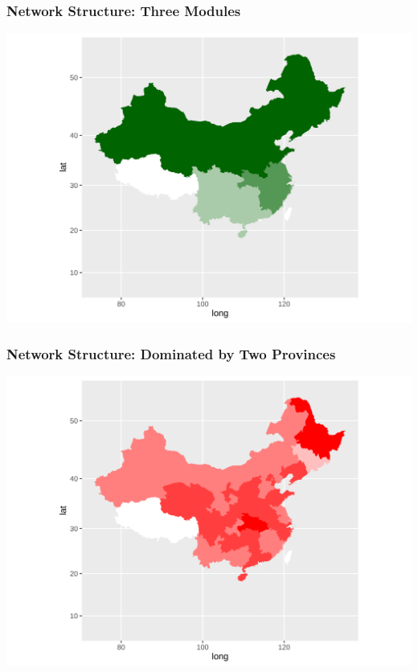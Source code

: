 \documentclass[aspectratio=169]{beamer}
\begin{document}
\begin{frame}
     \frametitle{Network Structure: Three Modules}
     \begin{center}
        \includegraphics[width=0.75\paperwidth]{images/map_for_modularity.png}
     \end{center}
\end{frame}

\begin{frame}
     \frametitle{Network Structure: Dominated by Two Provinces}
     \begin{center}
        \includegraphics[width=0.75\paperwidth]{images/map_for_centrality.png}
     \end{center}
\end{frame}
\end{document}
